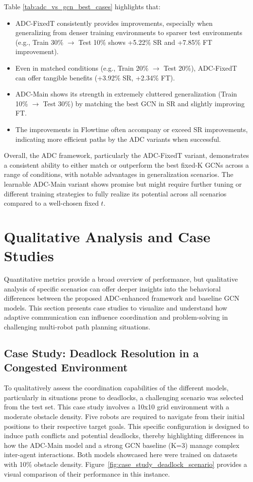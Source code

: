 Table \ref{tab:adc_vs_gcn_best_cases} highlights that:
\begin{itemize}
    \item ADC-FixedT consistently provides improvements, especially when generalizing from denser training environments to sparser test environments (e.g., Train 30\% $\rightarrow$ Test 10\% shows +5.22\% SR and +7.85\% FT improvement).
    \item Even in matched conditions (e.g., Train 20\% $\rightarrow$ Test 20\%), ADC-FixedT can offer tangible benefits (+3.92\% SR, +2.34\% FT).
    \item ADC-Main shows its strength in extremely cluttered generalization (Train 10\% $\rightarrow$ Test 30\%) by matching the best GCN in SR and slightly improving FT.
    \item The improvements in Flowtime often accompany or exceed SR improvements, indicating more efficient paths by the ADC variants when successful.
\end{itemize}
Overall, the ADC framework, particularly the ADC-FixedT variant, demonstrates a consistent ability to either match or outperform the best fixed-K GCNs across a range of conditions, with notable advantages in generalization scenarios. The learnable ADC-Main variant shows promise but might require further tuning or different training strategies to fully realize its potential across all scenarios compared to a well-chosen fixed $t$.

\section{Qualitative Analysis and Case Studies}
\label{sec:qualitative_analysis_detailed}

Quantitative metrics provide a broad overview of performance, but qualitative analysis of specific scenarios can offer deeper insights into the behavioral differences between the proposed ADC-enhanced framework and baseline GCN models. This section presents case studies to visualize and understand how adaptive communication can influence coordination and problem-solving in challenging multi-robot path planning situations.

\subsection{Case Study: Deadlock Resolution in a Congested Environment}
\label{subsec:case_study_deadlock}

To qualitatively assess the coordination capabilities of the different models, particularly in situations prone to deadlocks, a challenging scenario was selected from the test set. This case study involves a 10x10 grid environment with a moderate obstacle density. Five robots are required to navigate from their initial positions to their respective target goals. This specific configuration is designed to induce path conflicts and potential deadlocks, thereby highlighting differences in how the ADC-Main model and a strong GCN baseline (K=3) manage complex inter-agent interactions. Both models showcased here were trained on datasets with 10\% obstacle density. Figure~\ref{fig:case_study_deadlock_scenario} provides a visual comparison of their performance in this instance.


